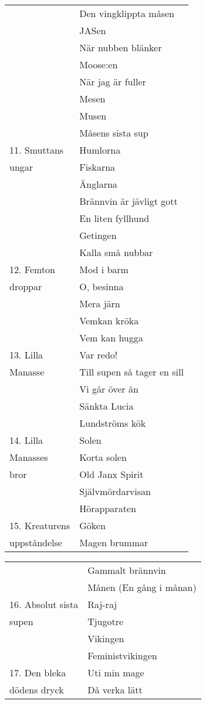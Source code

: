 \documentclass[a6paper,10pt]{article}
\begin{document}
\begin{table}[!h]
\begin{tabularx}{1\textwidth}{l X}
&Den vingklippta måsen\\
&JASen\\
&När nubben blänker\\
&Moose:en\\
&När jag är fuller\\
&Mesen\\
&Musen\\
&Måsens sista sup\\
11. Smuttans&Humlorna\\
\hspace{17pt}ungar&Fiskarna\\
&Änglarna\\
&Brännvin är jävligt gott\\
&En liten fyllhund\\
&Getingen\\
&Kalla små nubbar\\
12. Femton&Mod i barm\\
\hspace{17pt}droppar&O, besinna\\
&Mera järn\\
&Vemkan kröka\\
&Vem kan hugga\\
13. Lilla&Var redo!\\
\hspace{17pt}Manasse&Till supen så tager en sill\\
&Vi går över ån\\
&Sänkta Lucia\\
&Lundströms kök\\
14. Lilla&Solen\\
\hspace{17pt}Manasses&Korta solen\\
\hspace{17pt}bror&Old Janx Spirit\\
&Självmördarvisan\\
&Hörapparaten\\
15. Kreaturens&Göken\\
\hspace{17pt}uppståndelse&Magen brummar
\end{tabularx}
\end{table}
\newpage
\begin{table}[!h]
\begin{tabularx}{1\textwidth}{l X}
&Gammalt brännvin\\
&Månen (En gång i månan)\\
16. Absolut sista&Raj-raj\\
\hspace{17pt}supen&Tjugotre\\
&Vikingen\\
&Feministvikingen\\
17. Den bleka&Uti min mage\\
\hspace{17pt}dödens dryck&Då verka lätt
\end{tabularx}
\end{table}
\end{document}
